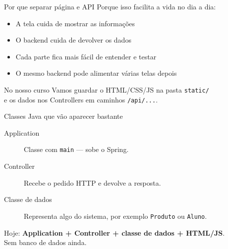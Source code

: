 \documentclass[aspectratio=169,11pt]{beamer}
\begin{document}
\begin{frame}{Por que separar página e API}
  Porque isso facilita a vida no dia a dia:

  \vspace{0.5em}
  \begin{itemize}
    \item A tela cuida de mostrar as informações
    \item O backend cuida de devolver os dados
    \item Cada parte fica mais fácil de entender e testar
    \item O mesmo backend pode alimentar várias telas depois
  \end{itemize}

  \vspace{0.7em}
  \begin{block}{No nosso curso}
    Vamos guardar o HTML/CSS/JS na pasta \texttt{static/}\\
    e os dados nos Controllers em caminhos \texttt{/api/...}.
  \end{block}
\end{frame}

\begin{frame}{Classes Java que vão aparecer bastante}
  \begin{description}
    \item[Application] Classe com \texttt{main} --- sobe o Spring.
    \item[Controller] Recebe o pedido HTTP e devolve a resposta.
    \item[Classe de dados] Representa algo do sistema,
      por exemplo \texttt{Produto} ou \texttt{Aluno}.
  \end{description}

  \vspace{0.8em}
  Hoje: \textbf{Application + Controller + classe de dados + HTML/JS}.\\
  Sem banco de dados ainda.
\end{frame}
\end{document}
